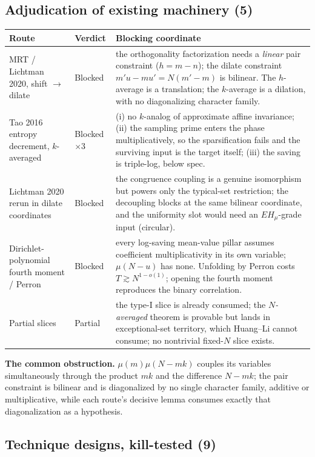 \documentclass[11pt,a4paper]{article}
\theoremstyle{plain}
\theoremstyle{definition}
\begin{document}
\subsection{Adjudication of existing machinery (5)}

\begin{longtable}{p{}p{}p{}}
\hline
Route & Verdict & Blocking coordinate\\
\hline
\endhead
MRT / Lichtman 2020, shift $\to$ dilate & Blocked &
 the orthogonality factorization needs a \emph{linear} pair
 constraint ($h = m-n$); the dilate constraint
 $m'u - mu' = N(m'-m)$ is bilinear. The $h$-average is a translation;
 the $k$-average is a dilation, with no diagonalizing character
 family.\\
Tao 2016 entropy decrement, $k$-averaged & Blocked $\times 3$ &
 (i) no $k$-analog of approximate affine invariance; (ii) the sampling
 prime enters the phase multiplicatively, so the sparsification fails
 and the surviving input is the target itself; (iii) the saving is
 triple-log, below spec.\\
Lichtman 2020 rerun in dilate coordinates & Blocked &
 the congruence coupling is a genuine isomorphism but powers only the
 typical-set restriction; the decoupling blocks at the same bilinear
 coordinate, and the uniformity slot would need an $EH_\mu$-grade
 input (circular).\\
Dirichlet-polynomial fourth moment / Perron & Blocked &
 every log-saving mean-value pillar assumes coefficient
 multiplicativity in its own variable; $\mu(N-u)$ has none. Unfolding
 by Perron costs $T \gtrsim N^{1-o(1)}$; opening the fourth moment
 reproduces the binary correlation.\\
Partial slices & Partial &
 the type-I slice is already consumed; the \emph{$N$-averaged}
 theorem is provable but lands in exceptional-set territory, which
 Huang--Li cannot consume; no nontrivial fixed-$N$ slice exists.\\
\hline
\end{longtable}

\noindent
\textbf{The common obstruction.} $\mu(m)\mu(N-mk)$ couples its
variables simultaneously through the product $mk$ and the difference
$N-mk$; the pair constraint is bilinear and is diagonalized by no
single character family, additive or multiplicative, while each
route's decisive lemma consumes exactly that diagonalization as a
hypothesis.

\subsection{Technique designs, kill-tested (9)}
\end{document}
